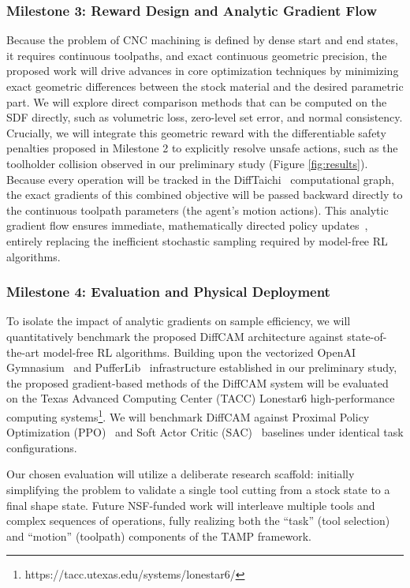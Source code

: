 \documentclass[11pt, letterpaper]{article}
\begin{document}
\subsubsection*{Milestone 3: Reward Design and Analytic Gradient Flow}

Because the problem of CNC machining is defined by dense start and end states, it requires continuous toolpaths, and exact continuous geometric precision, the proposed work will drive advances in core optimization techniques by minimizing exact geometric differences between the stock material and the desired parametric part.
We will explore direct comparison methods that can be computed on the SDF directly, such as volumetric loss, zero-level set error, and normal consistency.
Crucially, we will integrate this geometric reward with the differentiable safety penalties proposed in Milestone 2 to explicitly resolve unsafe actions, such as the toolholder collision observed in our preliminary study (Figure \ref{fig:results}). 
Because every operation will be tracked in the DiffTaichi~\cite{hu2019difftaichi} computational graph, the exact gradients of this combined objective will be passed backward directly to the continuous toolpath parameters (the agent's motion actions).
This analytic gradient flow ensures immediate, mathematically directed policy updates~\cite{xu2022accelerated}, entirely replacing the inefficient stochastic sampling required by model-free RL algorithms.

\subsubsection*{Milestone 4: Evaluation and Physical Deployment}

To isolate the impact of analytic gradients on sample efficiency, we will quantitatively benchmark the proposed DiffCAM architecture against state-of-the-art model-free RL algorithms.
Building upon the vectorized OpenAI Gymnasium~\cite{towers2024gymnasium} and PufferLib~\cite{suarez2024pufferlib} infrastructure established in our preliminary study, the proposed gradient-based methods of the DiffCAM system will be evaluated on the Texas Advanced Computing Center (TACC) Lonestar6 high-performance computing systems\footnote{https://tacc.utexas.edu/systems/lonestar6/}.
We will benchmark DiffCAM against Proximal Policy Optimization (PPO)~\cite{schulman2017proximal} and Soft Actor Critic (SAC)~\cite{haarnoja2018soft} baselines under identical task configurations.

Our chosen evaluation will utilize a deliberate research scaffold: initially simplifying the problem to validate a single tool cutting from a stock state to a final shape state.
Future NSF-funded work will interleave multiple tools and complex sequences of operations, fully realizing both the ``task'' (tool selection) and ``motion'' (toolpath) components of the TAMP framework.
\end{document}
